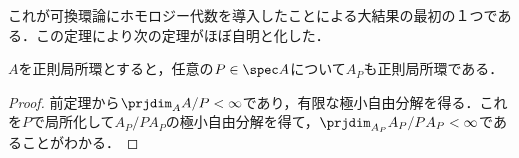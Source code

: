 これが可換環論にホモロジー代数を導入したことによる大結果の最初の１つである．この定理により次の定理がほぼ自明と化した．
\begin{thm}[Serreの定理]\label{thm:Serreの定理}
	$A$を正則局所環とすると，任意の$P\in\spec A$について$A_P$も正則局所環である．
\end{thm}

\begin{proof}
	前定理から$\prjdim_A A/P<\infty$であり，有限な極小自由分解を得る．これを$P$で局所化して$A_P/PA_P$の極小自由分解を得て，$\prjdim_{A_P} A_P/PA_P<\infty$であることがわかる．
\end{proof}



